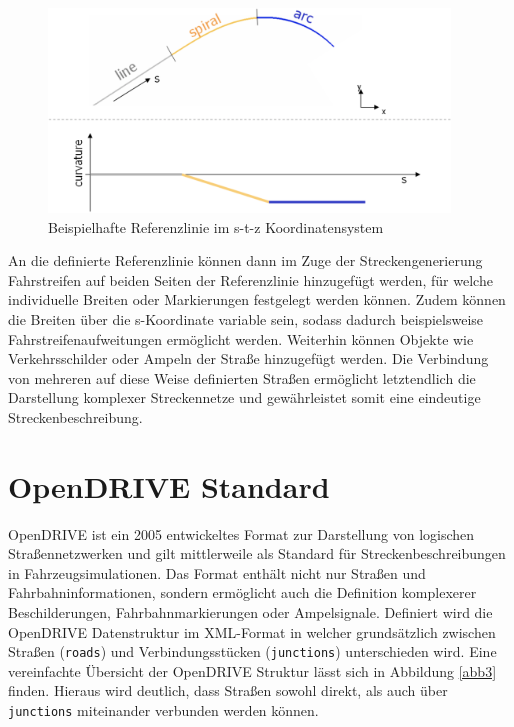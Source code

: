 \begin{figure}[H]
\flushleft
\includegraphics[width=0.95\textwidth]{fig/fig2.png}
\caption{Beispielhafte Referenzlinie im s-t-z Koordinatensystem \cite{Becker.2017}}
\label{abb2}
\end{figure}

An die definierte Referenzlinie können dann im Zuge der Streckengenerierung Fahrstreifen auf beiden Seiten der Referenzlinie hinzugefügt werden, für welche individuelle Breiten oder Markierungen festgelegt werden können. Zudem können die Breiten über die s-Koordinate variable sein, sodass dadurch beispielsweise Fahrstreifenaufweitungen ermöglicht werden. Weiterhin können Objekte wie Verkehrsschilder oder Ampeln der Straße hinzugefügt werden. Die Verbindung von mehreren auf diese Weise definierten Straßen ermöglicht letztendlich die Darstellung komplexer Streckennetze und gewährleistet somit eine eindeutige Streckenbeschreibung.

\section{OpenDRIVE Standard}

OpenDRIVE ist ein 2005 entwickeltes Format zur Darstellung von logischen Straßennetzwerken und gilt mittlerweile als Standard für Streckenbeschreibungen in Fahrzeugsimulationen. Das Format enthält nicht nur Straßen und Fahrbahninformationen, sondern ermöglicht auch die Definition komplexerer Beschilderungen, Fahrbahnmarkierungen oder Ampelsignale. \cite{OpenDRIVE.2019} Definiert wird die OpenDRIVE Datenstruktur im XML-Format in welcher grundsätzlich zwischen Straßen (\texttt{roads}) und Verbindungsstücken (\texttt{junctions}) unterschieden wird. Eine vereinfachte Übersicht der OpenDRIVE Struktur lässt sich in Abbildung \ref{abb3} finden. Hieraus wird deutlich, dass Straßen sowohl direkt, als auch über \texttt{junctions} miteinander verbunden werden können.

